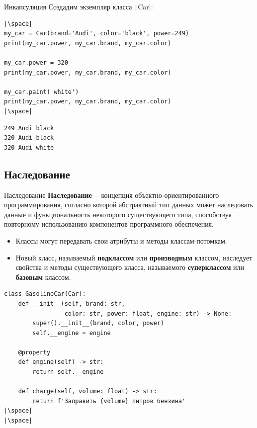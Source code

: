\documentclass[aspectratio=169, mathserif]{beamer}	%
\begin{document}
\begin{frame}[fragile]{Инкапсуляция}
\scriptsize
Создадим экземпляр класса \texttt|Car|:
\vfill
\begin{verbatim}
|\space|
my_car = Car(brand='Audi', color='black', power=249)
print(my_car.power, my_car.brand, my_car.color)

my_car.power = 320
print(my_car.power, my_car.brand, my_car.color)

my_car.paint('white')
print(my_car.power, my_car.brand, my_car.color)
|\space|
\end{verbatim}
\begin{verbatim}
249 Audi black
320 Audi black
320 Audi white
\end{verbatim}
\vfill
\end{frame}


\subsection{Наследование}
\begin{frame}[fragile]{Наследование}
\scriptsize
\textcolor{tpugreen}{\textbf{Наследование}}~-- концепция объектно-ориентированного программирования, согласно которой абстрактный тип данных может наследовать данные и функциональность некоторого существующего типа, способствуя повторному использованию компонентов программного обеспечения.
\begin{itemize}
\item Классы могут передавать свои атрибуты и методы классам-потомкам.
\item Новый класс, называемый \textbf{подклассом} или \textbf{производным} классом, наследует свойства и методы существующего класса, называемого \textbf{суперклассом} или \textbf{базовым} классом.
\end{itemize}
\vfill
\begin{verbatim}
class GasolineCar(Car):
    def __init__(self, brand: str,
                 color: str, power: float, engine: str) -> None:
        super().__init__(brand, color, power)
        self.__engine = engine

    @property
    def engine(self) -> str:
        return self.__engine

    def charge(self, volume: float) -> str:
        return f'Заправить {volume} литров бензина'
|\space|
|\space|
\end{verbatim}
\vfill
\end{frame}
\end{document}

